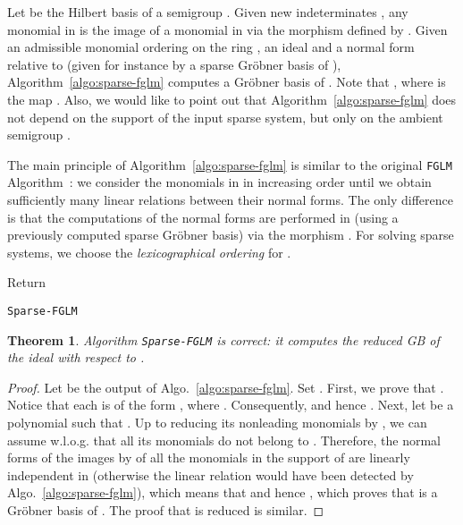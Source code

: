 \documentclass[12pt]{article}
\numberwithin{equation}{section}
\newtheorem{theorem}{Theorem}
\numberwithin{theorem}{section}
\begin{document}
Let  be the Hilbert basis of a semigroup
. Given new indeterminates , any
monomial in  is the image of a monomial in  via the morphism
 defined by
. Given an admissible monomial ordering  on the ring ,
an ideal  and a normal form relative to  (given for
instance by a sparse Gr\"obner basis of ),
Algorithm~\ref{algo:sparse-fglm} computes a Gr\"obner basis of
. Note that , where  is the map . Also, we would like to point out that 
Algorithm~\ref{algo:sparse-fglm} does not depend on the support of the
input sparse system, but only on the ambient semigroup .

The main principle of Algorithm~\ref{algo:sparse-fglm} is similar to
the original {\tt FGLM} Algorithm~\cite{FGLM}: we consider the monomials in
 in increasing order until we obtain sufficiently
many linear relations between their normal forms. The only difference
is that the computations of the normal forms are performed in
 (using a previously computed sparse Gr\"obner basis) via the
morphism . For solving sparse systems, we choose
the \emph{lexicographical ordering} for .


\begin{algorithm}\label{algo:sparse-fglm}
  \Comment*[l]{\small //}
  Return \;
  \caption{{\tt Sparse-FGLM}}
\end{algorithm}

\begin{theorem}
\label{th:FGLMcorrectness}
 Algorithm {\tt Sparse-FGLM} is correct: it computes the reduced GB of the
ideal  with respect to .
\end{theorem}
\begin{proof}
Let  be the output of Algo.~\ref{algo:sparse-fglm}. Set . First, we prove that
. Notice that each  is of the form
, where . Consequently,
 and hence . Next, let
 be a polynomial such that
. Up to reducing its nonleading
monomials by , we can assume w.l.o.g. that all its monomials do not
belong to . Therefore, the normal forms of the
images by  of all the monomials in the support of  are
linearly independent in  (otherwise the linear relation would
have been detected by Algo.~\ref{algo:sparse-fglm}), which means that
 and hence , which
proves that  is a Gr\"obner basis of
. The proof that  is reduced is similar.
\end{proof}
\end{document}
